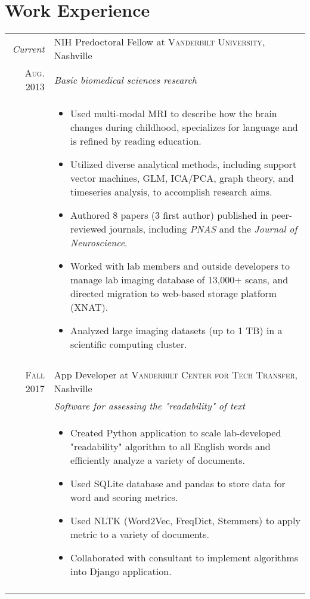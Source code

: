 \documentclass[a4paper,10pt]{article}
\begin{document}
\section{Work Experience}
\begin{tabular}{r|p{11cm}}
 

 
 	\emph{Current} & NIH Predoctoral Fellow at \textsc{Vanderbilt University}, Nashville \\
 	\textsc{Aug. 2013}&\emph{Basic biomedical sciences research}\\
 	&\footnotesize{
 	\begin{itemize}
    	\item Used multi-modal MRI to describe how the brain changes during childhood, specializes for language and is refined by reading education.
    	\item Utilized diverse analytical methods, including support vector machines, GLM, ICA/PCA, graph theory, and timeseries analysis, to accomplish research aims.
        \item Authored 8 papers (3 first author) published in peer-reviewed journals,  including  \textit{PNAS} and the  \textit{Journal of Neuroscience}.
        \item Worked with lab members and outside developers to manage lab imaging database of 13,000+ scans, and directed migration to web-based storage platform (XNAT).
        \item Analyzed large imaging datasets (up to 1 TB) in a scientific computing cluster.
	\end{itemize}}\\
	\multicolumn{2}{c}{} \\
    
	\textsc{Fall} 2017 & App Developer at \textsc{Vanderbilt Center for Tech Transfer}, Nashville \\
	&\emph{Software for assessing the "readability" of text}\\
	&\footnotesize{
	\begin{itemize}
	    \item Created Python application to scale lab-developed "readability" algorithm to all English words and efficiently analyze a variety of documents. 
	    \item Used SQLite database and pandas to store data for word and scoring metrics.
	    \item Used NLTK (Word2Vec, FreqDict, Stemmers) to apply metric to a variety of documents.
	    \item Collaborated with consultant to implement algorithms into Django application. 
    \end{itemize}}\\
 	\multicolumn{2}{c}{} \\


\end{tabular}
\end{document}
